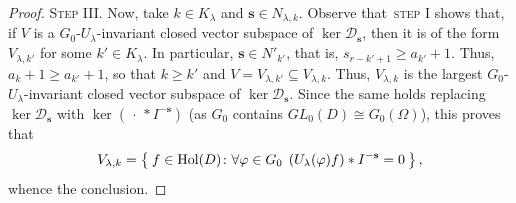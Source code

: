 \documentclass[10.5pt,reqno]{amsart}
\newcommand{\Hol}{\mathrm{Hol}}
\newcommand{\vect}[1]{\mathbf{{#1}}}
\newcommand{\Dc}{\mathcal{D}}
\newcommand{\Meg}{\geqslant}
\renewcommand{\phi}{\varphi}
\begin{document}
\begin{proof}
	\textsc{Step III.} Now, take $k\in K_\lambda$ and $\vect s\in N_{\lambda,k}$. Observe that~\textsc{step I} shows that, if $V$ is a $G_0$-$U_\lambda$-invariant closed vector subspace of $\ker \Dc_{\vect s}$, then it is of the form $V_{\lambda,k'}$ for some $k'\in K_\lambda$. In particular, $\vect s\in N'_{k'}$, that is, $s_{r-k'+1}\Meg a_{k'}+1$. Thus, $a_k+1\Meg a_{k'}+1$, so that $k\Meg k'$ and  $V=V_{\lambda,k'}\subseteq V_{\lambda,k}$. Thus, $V_{\lambda,k}$ is the largest $G_0$-$U_\lambda$-invariant closed vector subspace of $\ker \Dc_{\vect s}$. Since the same holds replacing $\ker \Dc_{\vect s}$ with $\ker (\,\cdot\,*I^{-\vect s})$ (as $G_0$ contains $GL_0(D)\cong G_0(\Omega)$), this proves that
	\[
	V_{\lambda,k}=\Set{f\in \Hol(D)\colon \forall \phi\in G_0\:\: (U_\lambda(\phi) f)*I^{-\vect s}=0  },
	\]
	whence the conclusion.
\end{proof}
\end{document}
